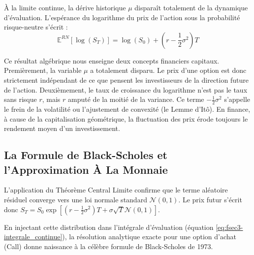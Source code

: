 \begin{theorembox}
À la limite continue, la dérive historique $\mu$ disparaît totalement de la dynamique d'évaluation. L'espérance du logarithme du prix de l'action sous la probabilité risque-neutre s'écrit :
\begin{equation}
    \label{eq:fsec3-limite_log_st}
    \mathbb{E}^{RN}[\log(S_T)] = \log(S_0) + \left( r - \frac{1}{2}\sigma^2 \right) T
\end{equation}
\end{theorembox}

Ce résultat algébrique nous enseigne deux concepts financiers capitaux.
Premièrement, la variable $\mu$ a totalement disparu. Le prix d'une option est donc strictement indépendant de ce que pensent les investisseurs de la direction future de l'action. 
Deuxièmement, le taux de croissance du logarithme n'est pas le taux sans risque $r$, mais $r$ amputé de la moitié de la variance. Ce terme $-\frac{1}{2}\sigma^2$ s'appelle le frein de la volatilité ou l'ajustement de convexité (le Lemme d'Itô). En finance, à cause de la capitalisation géométrique, la fluctuation des prix érode toujours le rendement moyen d'un investissement.

\subsection{La Formule de Black-Scholes et l'Approximation À La Monnaie}

L'application du Théorème Central Limite confirme que le terme aléatoire résiduel converge vers une loi normale standard $\mathcal{N}(0,1)$. Le prix futur s'écrit donc $S_T = S_0 \exp\left[ (r - \frac{1}{2}\sigma^2)T + \sigma \sqrt{T} \mathcal{N}(0,1) \right]$.

En injectant cette distribution dans l'intégrale d'évaluation (équation \ref{eq:fsec3-integrale_continue}), la résolution analytique exacte pour une option d'achat (Call) donne naissance à la célèbre formule de Black-Scholes de 1973.

